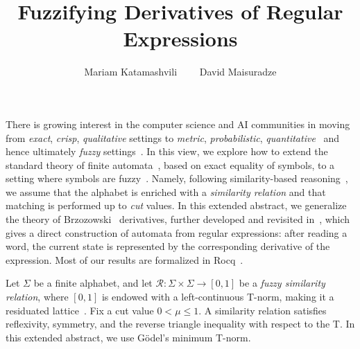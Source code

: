 \documentclass{easychair}
\title{Fuzzifying Derivatives of Regular Expressions}
\author{
Mariam Katamashvili\inst{1}%
\ \ \ \ David Maisuradze\inst{1}
}
\institute{
Kutaisi International University, Kutaisi, Georgia
}
\begin{document}
\maketitle
There is growing interest in the computer science and AI communities in moving from {\em exact}, {\em crisp}, {\em qualitative} settings to {\em metric}, {\em probabilistic}, {\em quantitative}~\cite{AlvesKesnerRamos2025,SilvaBonchiBonsangueRutten2011} and hence ultimately {\em fuzzy} settings~\cite{met05}. In this view, we explore how to extend the standard theory of finite automata~\cite{C71}, based on exact equality of symbols, to a setting where symbols are fuzzy~\cite{DHMM}. Namely, following similarity-based reasoning~\cite{Sessa2002},
we assume that the alphabet is enriched with a {\em similarity relation}
and that matching is performed up to {\em cut} values. In this extended abstract, we generalize the theory of
Brzozowski~\cite{B62} derivatives, further developed and revisited
in~\cite{OwensReppyTuron}, which gives a direct construction of automata
from regular expressions: after reading a word, the current state is represented by the
corresponding derivative of the expression. Most of our results are formalized in Rocq~\cite{Rocq}.

Let $\Sigma$ be a finite alphabet, and let
$\mathcal R:\Sigma\times\Sigma\to[0,1]$
be a {\em fuzzy similarity relation}, where $[0,1]$ is endowed with a
left-continuous T-norm, making it a residuated lattice~\cite{met05}.
Fix a cut value $0<\mu\le1$.  A similarity relation satisfies reflexivity, symmetry, and the reverse triangle inequality with respect to the T. In this extended abstract, we use G\"odel's minimum T-norm.
\end{document}
